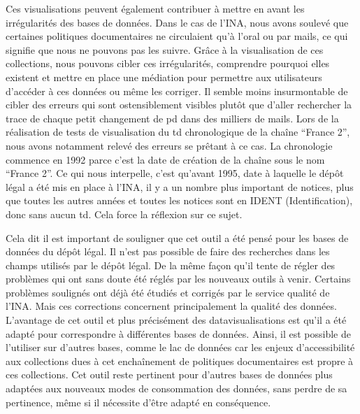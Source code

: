 
Ces visualisations peuvent également contribuer à mettre en avant les irrégularités des bases de données. Dans le cas de l'INA, nous avons soulevé que certaines politiques documentaires ne circulaient qu'à l'oral ou par mails, ce qui signifie que nous ne pouvons pas les suivre. Grâce à la visualisation de ces collections, nous pouvons cibler ces irrégularités, comprendre pourquoi elles existent et mettre en place une médiation pour permettre aux utilisateurs d'accéder à ces données ou même les corriger. Il semble moins insurmontable de cibler des erreurs qui sont ostensiblement visibles plutôt que d'aller rechercher la trace de chaque petit changement de \gls{pd} dans des milliers de mails. Lors de la réalisation de tests de visualisation du \gls{td} chronologique de la chaîne \enquote{France 2}, nous avons notamment relevé des erreurs se prêtant à ce cas. La chronologie commence en 1992 parce c'est la date de création de la chaîne sous le nom \enquote{France 2}. Ce qui nous interpelle, c'est qu'avant 1995, date à laquelle le dépôt légal a été mis en place à l'INA, il y a un nombre plus important de notices, plus que toutes les autres années et toutes les notices sont en IDENT (Identification), donc sans aucun \gls{td}. Cela force la réflexion sur ce sujet. 




Cela dit il est important de souligner que cet outil a été pensé pour les bases de données du dépôt légal. Il n'est pas possible de faire des recherches dans les champs utilisés par le dépôt légal. De la même façon qu'il tente de régler des problèmes qui ont sans doute été réglés par les nouveaux outils à venir. Certains problèmes soulignés ont déjà été étudiés et corrigés par le service qualité de l'INA. Mais ces corrections concernent principalement la qualité des données. L'avantage de cet outil et plus précisément des datavisualisations est qu'il a été adapté pour correspondre à différentes bases de données. Ainsi, il est possible de l'utiliser sur d'autres bases, comme le lac de données car les enjeux d'accessibilité aux collections dues à cet enchaînement de politiques documentaires est propre à ces collections. Cet outil reste pertinent pour d'autres bases de données plus adaptées aux nouveaux modes de consommation des données, sans perdre de sa pertinence, même si il nécessite d'être adapté en conséquence. 

